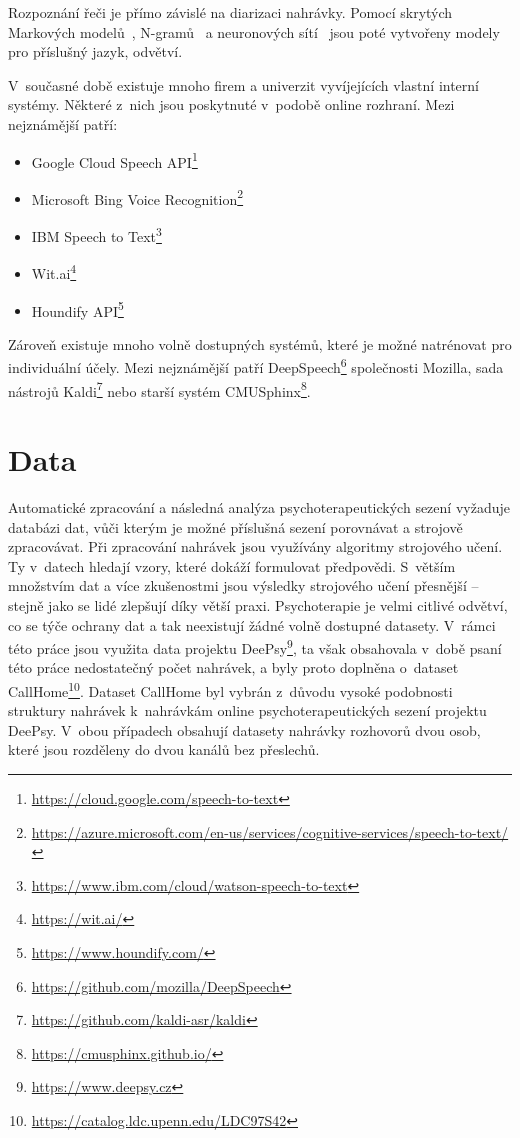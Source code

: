 Rozpoznání řeči je přímo závislé na diarizaci nahrávky. Pomocí skrytých Markových modelů~\cite{Cernocky_ZRE}, N-gramů~\cite{jurafsky_martin_2020} a neuronových sítí~\cite{Bishop_pattern} jsou poté vytvořeny modely pro příslušný jazyk, odvětví.

V~současné době existuje mnoho firem a univerzit vyvíjejících vlastní interní systémy. Některé z~nich jsou poskytnuté v~podobě online rozhraní. Mezi nejznámější patří:

\begin{itemize}
    \item Google Cloud Speech API\footnote{\url{https://cloud.google.com/speech-to-text}}
    \item Microsoft Bing Voice Recognition\footnote{\url{https://azure.microsoft.com/en-us/services/cognitive-services/speech-to-text/}}
    \item IBM Speech to Text\footnote{\url{https://www.ibm.com/cloud/watson-speech-to-text}}
    \item Wit.ai\footnote{\url{https://wit.ai/}}
    \item Houndify API\footnote{\url{https://www.houndify.com/}}
\end{itemize}

Zároveň existuje mnoho volně dostupných systémů, které je možné natrénovat pro individuální účely. Mezi nejznámější patří DeepSpeech\footnote{\url{https://github.com/mozilla/DeepSpeech}} společnosti Mozilla, sada nástrojů Kaldi\footnote{\url{https://github.com/kaldi-asr/kaldi}} nebo starší systém CMUSphinx\footnote{\url{https://cmusphinx.github.io/}}.



\chapter{Data}
\label{chap:Data}
Automatické zpracování a následná analýza psychoterapeutických sezení vyžaduje databázi dat, vůči kterým je možné příslušná sezení porovnávat a strojově zpracovávat. Při zpracování nahrávek jsou využívány algoritmy strojového učení. Ty v~datech hledají vzory, které dokáží formulovat předpovědi. S~větším množstvím dat a více zkušenostmi jsou výsledky strojového učení přesnější – stejně jako se lidé zlepšují díky větší praxi. Psychoterapie je velmi citlivé odvětví, co se týče ochrany dat a tak neexistují žádné volně dostupné datasety. V~rámci této práce jsou využita data projektu DeePsy\footnote{\url{https://www.deepsy.cz}}, ta však obsahovala v~době psaní této práce nedostatečný počet nahrávek, a byly proto doplněna o~dataset CallHome\footnote{\url{https://catalog.ldc.upenn.edu/LDC97S42}}. Dataset CallHome byl vybrán z~důvodu vysoké podobnosti struktury nahrávek k~nahrávkám online psychoterapeutických sezení projektu DeePsy. V~obou případech obsahují datasety nahrávky rozhovorů dvou osob, které jsou rozděleny do dvou kanálů bez přeslechů.

